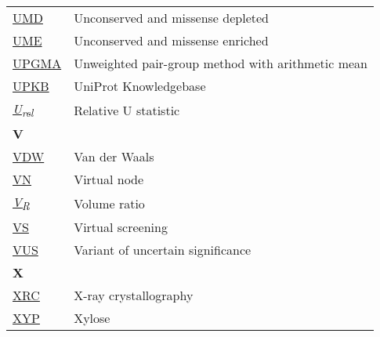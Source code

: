 \begin{longtable}[l]{@{}p{2.5cm}p{12cm}@{}}
\textmd{\href{https://www.nature.com/articles/s42003-024-06117-5}{UMD}} & Unconserved and missense depleted \\
\textmd{\href{https://www.nature.com/articles/s42003-024-06117-5}{UME}} & Unconserved and missense enriched \\
\textmd{\href{https://en.wikipedia.org/wiki/UPGMA}{UPGMA}} & Unweighted pair-group method with arithmetic mean \\
\textmd{\href{https://www.uniprot.org/help/uniprotkb}{UPKB}} & UniProt Knowledgebase \\
\textmd{\href{https://www.nature.com/articles/s42003-024-05970-8}{\textit{U\textsubscript{rel}}}} & Relative U statistic \\[0.3175cm]
\textbf{\large V} & \\[0.25cm]
\textmd{\href{https://en.wikipedia.org/wiki/Van_der_Waals_force}{VDW}} & Van der Waals \\
\textmd{\href{https://arxiv.org/abs/2404.07194}{VN}} & Virtual node \\
\textmd{\href{https://jcheminf.biomedcentral.com/articles/10.1186/s13321-024-00923-z}{\textit{V\textsubscript{R}}}} & Volume ratio \\
\textmd{\href{https://en.wikipedia.org/wiki/Virtual_screening}{VS}} & Virtual screening \\
\textmd{\href{https://en.wikipedia.org/wiki/Variant_of_uncertain_significance}{VUS}} & Variant of uncertain significance \\[0.3175cm]
\textbf{\large X} & \\[0.25cm]
\textmd{\href{https://en.wikipedia.org/wiki/X-ray_crystallography}{XRC}} & X-ray crystallography \\
\textmd{\href{https://www.ebi.ac.uk/pdbe-srv/pdbechem/chemicalCompound/show/XYP}{XYP}} & Xylose \\[0.3175cm]

\end{longtable}

